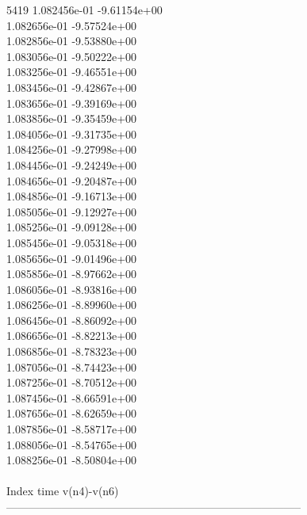 5419	1.082456e-01	-9.61154e+00	\\ 	1.082656e-01	-9.57524e+00	\\ 	1.082856e-01	-9.53880e+00	\\ 	1.083056e-01	-9.50222e+00	\\ 	1.083256e-01	-9.46551e+00	\\ 	1.083456e-01	-9.42867e+00	\\ 	1.083656e-01	-9.39169e+00	\\ 	1.083856e-01	-9.35459e+00	\\ 	1.084056e-01	-9.31735e+00	\\ 	1.084256e-01	-9.27998e+00	\\ 	1.084456e-01	-9.24249e+00	\\ 	1.084656e-01	-9.20487e+00	\\ 	1.084856e-01	-9.16713e+00	\\ 	1.085056e-01	-9.12927e+00	\\ 	1.085256e-01	-9.09128e+00	\\ 	1.085456e-01	-9.05318e+00	\\ 	1.085656e-01	-9.01496e+00	\\ 	1.085856e-01	-8.97662e+00	\\ 	1.086056e-01	-8.93816e+00	\\ 	1.086256e-01	-8.89960e+00	\\ 	1.086456e-01	-8.86092e+00	\\ 	1.086656e-01	-8.82213e+00	\\ 	1.086856e-01	-8.78323e+00	\\ 	1.087056e-01	-8.74423e+00	\\ 	1.087256e-01	-8.70512e+00	\\ 	1.087456e-01	-8.66591e+00	\\ 	1.087656e-01	-8.62659e+00	\\ 	1.087856e-01	-8.58717e+00	\\ 	1.088056e-01	-8.54765e+00	\\ 	1.088256e-01	-8.50804e+00	\\ \hline
\\ \hline
Index   time            v(n4)-v(n6)     \\ \hline
--------------------------------------------------------------------------------\\ \hline
